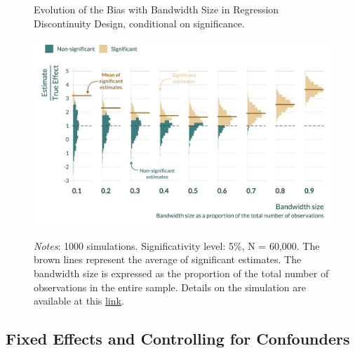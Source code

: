 \documentclass[usletter, 12pt]{article}
\begin{document}
       			 \begin{figure}[!h] 
				\begin{center}
					\caption{Evolution of the Bias with Bandwidth Size in Regression Discontinuity Design, conditional on significance.}
					\label{graph_RDD}
					\includegraphics[width=0.8\linewidth]{images/main_graph_RDD_paper_annotated.pdf}
		      			\caption*{\footnotesize \textit{Notes}: 1000 simulations. Significativity level: 5\%, N = 60,000. The brown lines represent the average of significant estimates. The bandwidth size is expressed as the proportion of the total number of observations in the entire sample. Details on the simulation are available at this \href{https://vincentbagilet.github.io/causal_exaggeration/RDD.html}{link}.}
				\end{center}
				\vspace{-1cm}
			\end{figure} 
		

		
		
		
		 \subsection{Fixed Effects and Controlling for Confounders}\label{sim_ctrl}
		
\end{document}
